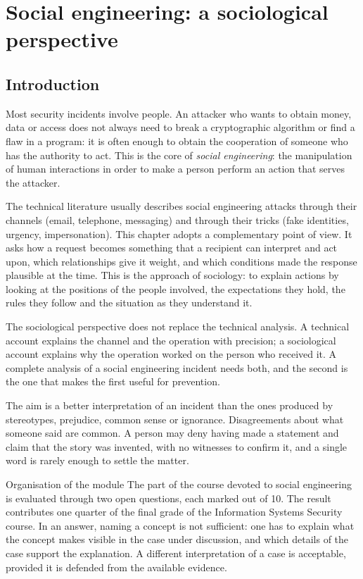 \chapter{Social engineering: a sociological perspective}

\section{Introduction}

Most security incidents involve people. An attacker who wants to obtain money, data or access does not always need to break a cryptographic algorithm or find a flaw in a program: it is often enough to obtain the cooperation of someone who has the authority to act. This is the core of \emph{social engineering}: the manipulation of human interactions in order to make a person perform an action that serves the attacker.

The technical literature usually describes social engineering attacks through their channels (email, telephone, messaging) and through their tricks (fake identities, urgency, impersonation). This chapter adopts a complementary point of view. It asks how a request becomes something that a recipient can interpret and act upon, which relationships give it weight, and which conditions made the response plausible at the time. This is the approach of sociology: to explain actions by looking at the positions of the people involved, the expectations they hold, the rules they follow and the situation as they understand it.

The sociological perspective does not replace the technical analysis. A technical account explains the channel and the operation with precision; a sociological account explains why the operation worked on the person who received it. A complete analysis of a social engineering incident needs both, and the second is the one that makes the first useful for prevention.

The aim is a better interpretation of an incident than the ones produced by stereotypes, prejudice, common sense or ignorance. Disagreements about what someone said are common. A person may deny having made a statement and claim that the story was invented, with no witnesses to confirm it, and a single word is rarely enough to settle the matter.

\begin{nota}{Organisation of the module}
	The part of the course devoted to social engineering is evaluated through two open questions, each marked out of 10. The result contributes one quarter of the final grade of the Information Systems Security course. In an answer, naming a concept is not sufficient: one has to explain what the concept makes visible in the case under discussion, and which details of the case support the explanation. A different interpretation of a case is acceptable, provided it is defended from the available evidence.
\end{nota}


